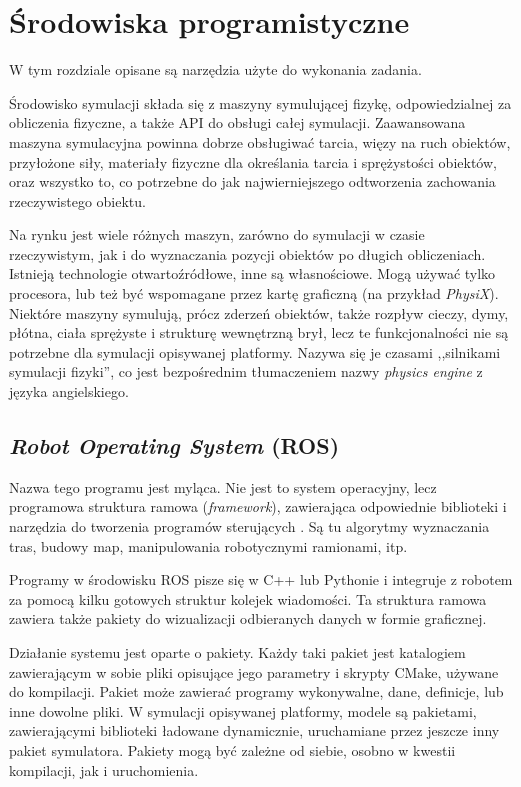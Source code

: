\chapter{Środowiska programistyczne} 
\label{sec:tools}
W tym rozdziale opisane są narzędzia użyte do wykonania zadania.

Środowisko symulacji składa się z maszyny symulującej fizykę, odpowiedzialnej za obliczenia fizyczne, a także API do obsługi całej symulacji.
Zaawansowana maszyna symulacyjna powinna dobrze obsługiwać tarcia, więzy na ruch obiektów, przyłożone siły, materiały fizyczne dla określania tarcia i sprężystości obiektów, 
oraz wszystko to, co potrzebne do jak najwierniejszego odtworzenia zachowania rzeczywistego obiektu.

Na rynku jest wiele różnych maszyn, zarówno do symulacji w czasie rzeczywistym, jak i do wyznaczania pozycji obiektów po długich obliczeniach.
Istnieją technologie otwartoźródłowe, inne są własnościowe. Mogą używać tylko procesora, lub też być wspomagane przez kartę graficzną (na przykład \emph{PhysiX}).
Niektóre maszyny symulują, prócz zderzeń obiektów, także rozpływ cieczy, dymy, płótna, ciała sprężyste i strukturę wewnętrzną brył, 
lecz te funkcjonalności nie są potrzebne dla symulacji opisywanej platformy. Nazywa się je czasami ,,silnikami symulacji fizyki'', co jest bezpośrednim tłumaczeniem nazwy
\emph{physics engine} z języka angielskiego.

\section{\emph{Robot Operating System} (ROS)}
	Nazwa tego programu jest myląca.
	Nie jest to system operacyjny, lecz programowa struktura ramowa (\emph{framework}), zawierająca odpowiednie biblioteki i narzędzia do tworzenia programów sterujących \cite{ros_website}.
	Są tu algorytmy wyznaczania tras, budowy map, manipulowania robotycznymi ramionami, itp. 

	Programy w środowisku ROS pisze się w C++ lub Pythonie i integruje z robotem za pomocą kilku gotowych struktur kolejek wiadomości.
	Ta struktura ramowa zawiera także pakiety do wizualizacji odbieranych danych w formie graficznej.

	Działanie systemu jest oparte o pakiety.
	Każdy taki pakiet jest katalogiem zawierającym w sobie pliki opisujące jego parametry i skrypty CMake, używane do kompilacji.
	Pakiet może zawierać programy wykonywalne, dane, definicje, lub inne dowolne pliki.
	W symulacji opisywanej platformy, modele są pakietami, zawierającymi biblioteki ładowane dynamicznie, uruchamiane przez jeszcze inny pakiet symulatora.
	Pakiety mogą być zależne od siebie, osobno w kwestii kompilacji, jak i uruchomienia.
	
